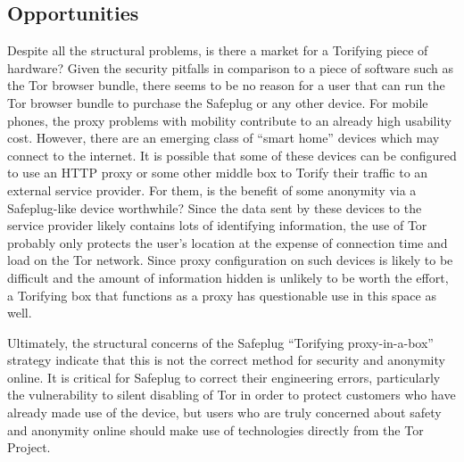 \subsection{Opportunities}
Despite all the structural problems, is there a market for a Torifying piece of hardware?  Given the security pitfalls in comparison to a piece of software such as the Tor browser bundle, there seems to be no reason for a user that can run the Tor browser bundle to purchase the Safeplug or any other device.  For mobile phones, the proxy problems with mobility contribute to an already high usability cost.  However, there are an emerging class of ``smart home'' devices which may connect to the internet.  It is possible that some of these devices can be configured to use an HTTP proxy or some other middle box to Torify their traffic to an external service provider.  For them, is the benefit of some anonymity via a Safeplug-like device worthwhile?  Since the data sent by these devices to the service provider likely contains lots of identifying information, the use of Tor probably only protects the user's location at the expense of connection time and load on the Tor network.  Since proxy configuration on such devices is likely to be difficult and the amount of information hidden is unlikely to be worth the effort, a Torifying box that functions as a proxy has questionable use in this space as well.

Ultimately, the structural concerns of the Safeplug ``Torifying proxy-in-a-box'' strategy indicate that this is not the correct method for security and anonymity online.  It is critical for Safeplug to correct their engineering errors, particularly the vulnerability to silent disabling of Tor in order to protect customers who have already made use of the device, but users who are truly concerned about safety and anonymity online should make use of technologies directly from the Tor Project.